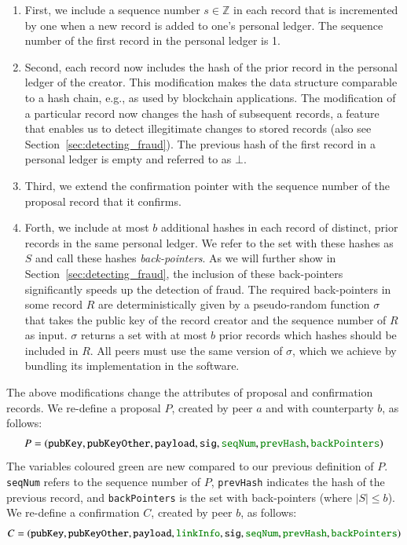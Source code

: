\begin{enumerate}
	\item First, we include a sequence number $ s \in \mathbb{Z} $ in each record that is incremented by one when a new record is added to one's personal ledger.
	The sequence number of the first record in the personal ledger is 1.
	\item Second, each record now includes the hash of the prior record in the personal ledger of the creator.
	This modification makes the \TrustChain{} data structure comparable to a hash chain, e.g., as used by blockchain applications.
	The modification of a particular record now changes the hash of subsequent records, a feature that enables us to detect illegitimate changes to stored records (also see Section~\ref{sec:detecting_fraud}).
	The previous hash of the first record in a personal ledger is empty and referred to as $ \bot $.
	\item Third, we extend the confirmation pointer with the sequence number of the proposal record that it confirms.
	\item Forth, we include at most $ b $ additional hashes in each record of distinct, prior records in the same personal ledger.
	We refer to the set with these hashes as $ S $ and call these hashes \emph{back-pointers}.
	As we will further show in Section~\ref{sec:detecting_fraud}, the inclusion of these back-pointers significantly speeds up the detection of fraud.
	The required back-pointers in some record $ R $ are deterministically given by a pseudo-random function $ \sigma $ that takes the public key of the record creator and the sequence number of $ R $ as input.
	$ \sigma $ returns a set with at most $ b $ prior records which hashes should be included in $ R $.
	All peers must use the same version of $ \sigma $, which we achieve by bundling its implementation in the \TrustChain{} software.
\end{enumerate}

The above modifications change the attributes of proposal and confirmation records.
We re-define a proposal $ P $, created by peer $ a $ and with counterparty $ b $, as follows:
\begin{align*}
	P = (\texttt{pubKey}, \texttt{pubKeyOther}, \texttt{payload}, \texttt{sig}, \textcolor{ao}{\texttt{seqNum}}, \textcolor{ao}{\texttt{prevHash}}, \textcolor{ao}{\texttt{backPointers}})
\end{align*}
The variables coloured green are new compared to our previous definition of $ P $.
\texttt{seqNum} refers to the sequence number of $ P $, \texttt{prevHash} indicates the hash of the previous record, and \texttt{backPointers} is the set with back-pointers (where $ |S| \leq b $).
We re-define a confirmation $ C $, created by peer $ b $, as follows:
\begin{align*}
	C = (\texttt{pubKey}, \texttt{pubKeyOther}, \texttt{payload}, \textcolor{ao}{\texttt{linkInfo}}, \texttt{sig},
	\textcolor{ao}{\texttt{seqNum}}, \textcolor{ao}{\texttt{prevHash}}, \textcolor{ao}{\texttt{backPointers}})
\end{align*}

